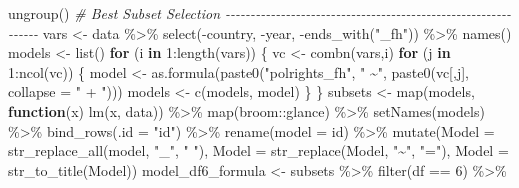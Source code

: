 \documentclass[
  english,
  man,floatsintext]{apa6}
\newenvironment{Shaded}{\begin{snugshade}}{\end{snugshade}}
\newcommand{\AttributeTok}[1]{\textcolor[rgb]{0.77,0.63,0.00}{#1}}
\newcommand{\CommentTok}[1]{\textcolor[rgb]{0.56,0.35,0.01}{\textit{#1}}}
\newcommand{\ControlFlowTok}[1]{\textcolor[rgb]{0.13,0.29,0.53}{\textbf{#1}}}
\newcommand{\DecValTok}[1]{\textcolor[rgb]{0.00,0.00,0.81}{#1}}
\newcommand{\FunctionTok}[1]{\textcolor[rgb]{0.00,0.00,0.00}{#1}}
\newcommand{\NormalTok}[1]{#1}
\newcommand{\OtherTok}[1]{\textcolor[rgb]{0.56,0.35,0.01}{#1}}
\newcommand{\SpecialCharTok}[1]{\textcolor[rgb]{0.00,0.00,0.00}{#1}}
\newcommand{\StringTok}[1]{\textcolor[rgb]{0.31,0.60,0.02}{#1}}
\begin{document}
\begin{Shaded}
\begin{Highlighting}[]
  \FunctionTok{ungroup}\NormalTok{()}
\CommentTok{\# Best Subset Selection {-}{-}{-}{-}{-}{-}{-}{-}{-}{-}{-}{-}{-}{-}{-}{-}{-}{-}{-}{-}{-}{-}{-}{-}{-}{-}{-}{-}{-}{-}{-}{-}{-}{-}{-}{-}{-}{-}{-}{-}{-}{-}{-}{-}{-}{-}{-}{-}{-}{-}{-}{-}{-}{-}{-}{-}{-}{-}{-}{-}{-}{-}{-}}
\NormalTok{vars }\OtherTok{\textless{}{-}}\NormalTok{ data }\SpecialCharTok{\%\textgreater{}\%} 
  \FunctionTok{select}\NormalTok{(}\SpecialCharTok{{-}}\NormalTok{country, }\SpecialCharTok{{-}}\NormalTok{year, }\SpecialCharTok{{-}}\FunctionTok{ends\_with}\NormalTok{(}\StringTok{"\_fh"}\NormalTok{)) }\SpecialCharTok{\%\textgreater{}\%}
  \FunctionTok{names}\NormalTok{()}
\NormalTok{models }\OtherTok{\textless{}{-}} \FunctionTok{list}\NormalTok{()}
\ControlFlowTok{for}\NormalTok{ (i }\ControlFlowTok{in} \DecValTok{1}\SpecialCharTok{:}\FunctionTok{length}\NormalTok{(vars)) \{}
\NormalTok{  vc }\OtherTok{\textless{}{-}} \FunctionTok{combn}\NormalTok{(vars,i)}
  \ControlFlowTok{for}\NormalTok{ (j }\ControlFlowTok{in} \DecValTok{1}\SpecialCharTok{:}\FunctionTok{ncol}\NormalTok{(vc)) \{}
\NormalTok{    model }\OtherTok{\textless{}{-}} \FunctionTok{as.formula}\NormalTok{(}\FunctionTok{paste0}\NormalTok{(}\StringTok{"polrights\_fh"}\NormalTok{, }\StringTok{" \textasciitilde{}"}\NormalTok{, }\FunctionTok{paste0}\NormalTok{(vc[,j], }\AttributeTok{collapse =} \StringTok{" + "}\NormalTok{)))}
\NormalTok{    models }\OtherTok{\textless{}{-}} \FunctionTok{c}\NormalTok{(models, model)}
\NormalTok{    \}}
\NormalTok{  \}}
\NormalTok{subsets }\OtherTok{\textless{}{-}} \FunctionTok{map}\NormalTok{(models, }\ControlFlowTok{function}\NormalTok{(x) }\FunctionTok{lm}\NormalTok{(x, data)) }\SpecialCharTok{\%\textgreater{}\%} 
  \FunctionTok{map}\NormalTok{(broom}\SpecialCharTok{::}\NormalTok{glance) }\SpecialCharTok{\%\textgreater{}\%} 
  \FunctionTok{setNames}\NormalTok{(models) }\SpecialCharTok{\%\textgreater{}\%} 
  \FunctionTok{bind\_rows}\NormalTok{(}\AttributeTok{.id =} \StringTok{"id"}\NormalTok{) }\SpecialCharTok{\%\textgreater{}\%} 
  \FunctionTok{rename}\NormalTok{(}\AttributeTok{model =}\NormalTok{ id) }\SpecialCharTok{\%\textgreater{}\%} 
  \FunctionTok{mutate}\NormalTok{(}\AttributeTok{Model =} \FunctionTok{str\_replace\_all}\NormalTok{(model, }\StringTok{"\_"}\NormalTok{, }\StringTok{" "}\NormalTok{),}
         \AttributeTok{Model =} \FunctionTok{str\_replace}\NormalTok{(Model, }\StringTok{"\textasciitilde{}"}\NormalTok{, }\StringTok{"="}\NormalTok{), }
         \AttributeTok{Model =} \FunctionTok{str\_to\_title}\NormalTok{(Model))}
\NormalTok{model\_df6\_formula }\OtherTok{\textless{}{-}}\NormalTok{ subsets }\SpecialCharTok{\%\textgreater{}\%} \FunctionTok{filter}\NormalTok{(df }\SpecialCharTok{==} \DecValTok{6}\NormalTok{) }\SpecialCharTok{\%\textgreater{}\%} 

\end{Highlighting}
\end{Shaded}
\end{document}
